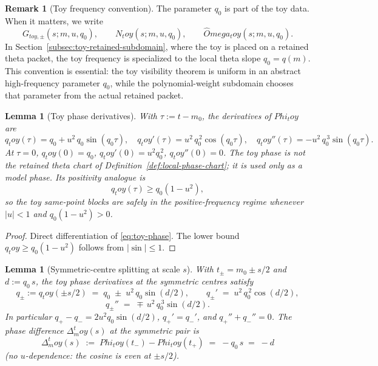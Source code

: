 \documentclass[11pt,a4paper]{amsart}
\def\Omega{Omega}%
\def\Phi{Phi}%
\def\toy{toy}%
\numberwithin{equation}{section}
\theoremstyle{plain}
\newtheorem{lemma}[theorem]{Lemma}
\theoremstyle{definition}
\newtheorem{remark}[theorem]{Remark}
\newcommand{\Om}{\Omega}
\newcommand{\Ph}{\Phi}
\newcommand{\Del}{\Delta}
\newcommand{\toy}{\mathrm{toy}}
\begin{document}
\begin{remark}[Toy frequency convention]
\label{rem:toy-frequency-convention}
The parameter \(q_0\) is part of the toy data.  When it matters, we
write
\[
        G_{\toy,\pm}(s;m,u,q_0),\qquad
        N_\toy(s;m,u,q_0),\qquad
        \widehat\Om_\toy(s;m,u,q_0).
\]
In Section~\ref{subsec:toy-retained-subdomain}, where the toy is placed
on a retained theta packet, the toy frequency is specialized to the
local theta slope \(q_0=q(m)\).  This convention is essential: the toy
visibility theorem is uniform in an abstract high-frequency parameter
\(q_0\), while the polynomial-weight subdomain chooses that parameter
from the actual retained packet.
\end{remark}

\begin{lemma}[Toy phase derivatives]
\label{lem:toy-phase-derivatives}
With \(\tau:=t-m_0\), the derivatives of \(\Ph_\toy\) are
\begin{equation}
\label{eq:toy-phase-derivatives}
q_\toy(\tau)
=q_0+u^2\,q_0\sin(q_0\tau),
\quad
q_\toy'(\tau)=u^2\,q_0^{\,2}\cos(q_0\tau),
\quad
q_\toy''(\tau)=-u^2\,q_0^{\,3}\sin(q_0\tau).
\end{equation}
At \(\tau=0\),
\(q_\toy(0)=q_0\), \(q_\toy'(0)=u^2 q_0^{\,2}\),
\(q_\toy''(0)=0\).  The toy phase is not the retained theta chart of
Definition~\ref{def:local-phase-chart}; it is used only as a model
phase.  Its positivity analogue is
\[
        q_\toy(\tau)\ge q_0(1-u^2),
\]
so the toy same-point blocks are safely in the positive-frequency regime
whenever \(|u|<1\) and \(q_0(1-u^2)>0\).
\end{lemma}

\begin{proof}
Direct differentiation of \eqref{eq:toy-phase}.  The lower bound
\(q_\toy\ge q_0(1-u^2)\) follows from \(|\sin|\le 1\).
\end{proof}

\begin{lemma}[Symmetric-centre splitting at scale \(s\)]
\label{lem:q-pm-split-at-centres}
With \(t_\pm=m_0\pm s/2\) and \(d:=q_0\,s\), the toy phase derivatives
at the symmetric centres satisfy
\begin{equation}
\label{eq:q-pm-symmetric-split}
q_\pm:=q_\toy(\pm s/2)\;=\;q_0\;\pm\;u^2\,q_0\sin(d/2),
\qquad
q_\pm'\;=\;u^2\,q_0^{\,2}\cos(d/2),
\end{equation}
\[
q_\pm''\;=\;\mp\,u^2\,q_0^{\,3}\sin(d/2).
\]
In particular \(q_+ - q_- = 2 u^2 q_0\sin(d/2)\),
\(q_+' = q_-'\), and \(q_+''+q_-'' = 0\).  The phase difference
\(\Del_m^\toy(s)\) at the symmetric pair is
\begin{equation}
\label{eq:toy-Delta}
\Del_m^\toy(s)\;:=\;\Ph_\toy(t_-)-\Ph_\toy(t_+)\;=\;-q_0\,s\;=\;-d
\end{equation}
(no \(u\)-dependence: the cosine is even at \(\pm s/2\)).
\end{lemma}
\end{document}
